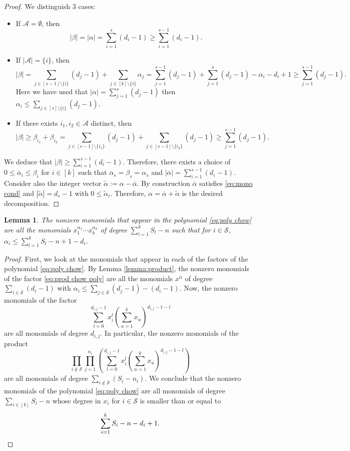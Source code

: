 \documentclass[11pt]{amsart}
\numberwithin{equation}{section}
\theoremstyle{plain}
\numberwithin{theorem}{section}
\newtheorem{lemma}[theorem]{Lemma}
\theoremstyle{definition}
\begin{document}
\begin{proof}
    We distinguish $3$ cases:
    \begin{itemize}
        \item If $\mathcal A=\emptyset$, then $$|\beta|=|\alpha|=\sum_{i=1}^s(d_i-1)\geq\sum_{i=1}^{s-1}(d_i-1).$$ 
        \item If $|\mathcal A|=\{i\}$, then 
        \[|\beta|=\sum_{j\in[s-1]\setminus\{i\}}(d_j-1) +\sum_{j\in[k]\setminus\{i\}}\alpha_j = 
        \sum_{j=1}^{s-1}(d_j-1) + \sum_{j=1}^s(d_j-1)-\alpha_i -d_i+1\geq \sum_{j=1}^{s-1}(d_j-1).
        \]
        Here we have used that $\displaystyle|\alpha|=\sum_{j=1}^s(d_j-1)$ then $\displaystyle\alpha_i\leq \sum_{j\in[s]\setminus\{i\}}(d_j-1)$.
        \item If there exists $i_1,i_2\in\mathcal A$ distinct, then
        \[|\beta|\geq \beta_{i_1}+\beta_{i_2} = \sum_{j\in[s-1]\setminus\{i_1\}}(d_j-1) +  \sum_{j\in[s-1]\setminus\{i_2\}}(d_j-1) \geq \sum_{j=1}^{s-1}(d_j-1).
        \]
    \end{itemize}
    We deduce that $|\beta|\geq \sum_{i=1}^{s-1}(d_i-1)$. Therefore, there exists a choice of $0\leq \overline{\alpha}_i\leq \beta_i$ for $i\in[k]$ such that $\overline{\alpha}_s = \beta_s=\alpha_s$ and $|\overline{\alpha}|=\sum_{i=1}^{s-1}(d_i-1)$. Consider also the integer vector $\tilde{\alpha}:=\alpha-\overline{\alpha}$. By construction $\overline{\alpha}$ satisfies \eqref{eq:mono cond} and $|\tilde{\alpha}|=d_s-1$ with $0\leq\tilde{\alpha}_i$. Therefore, $\alpha=\overline{\alpha}+\tilde{\alpha}$ is the desired decomposition.
\end{proof}


\begin{lemma}\label{lemma: monomials}
    The nonzero monomials that appear in the polynomial \eqref{eq:poly chow} are all the monomials $x_1^{\alpha_1}\cdots x_k^{\alpha_k}$ of degree $\displaystyle\sum_{l=1}^k S_l-n$ such that for $i\in\mathcal S$, $\displaystyle\alpha_i\leq \sum_{l=1}^kS_l -n+1-d_i$.
\end{lemma}
\begin{proof}
First, we look at the monomials that appear in each of the factors of the polynomial \eqref{eq:poly chow}. By Lemma \ref{lemma:product}, the nonzero monomials of the factor \eqref{eq:prod chow poly} are all the monomials $x^\alpha$ of degree $\sum_{i\in\mathcal S}(d_i-1)$ with $\alpha_i\leq \sum_{j\in\mathcal S}(d_j-1)-(d_i-1)$.
Now, the nonzero monomials of the factor 
\[ \displaystyle
        \sum_{l=0}^{d_{i,j}-1} x_i^l\left(\sum_{u=1}^kx_u\right)^{d_{i,j}-1-l}
        \]
are all monomials of degree $d_{i,j}$. In particular, the nonzero monomials of the product 
\[
 \displaystyle\prod_{i\not\in\mathcal S}\prod_{j=1}^{n_i}\left(    
        \sum_{l=0}^{d_{i,j}-1} x_i^l\left(\sum_{u=1}^kx_u\right)^{d_{i,j}-1-l}
        \right)
\]
are all monomials of degree $\sum_{i\not\in\mathcal S}(S_i-n_i)$. We conclude that the nonzero monomials of the polynomial \eqref{eq:poly chow} are all monomials of degree $\sum_{i\in[k]}S_i -n$ whose degree in $x_i$ for $i\in\mathcal S$ is smaller than or equal to
\[\sum_{i=1}^kS_i -n-d_i+1.\qedhere\]
\end{proof}
\end{document}
